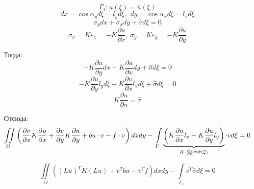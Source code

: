 \documentclass{bmstu}
\begin{document}
	\[\Gamma_1: u(\xi) = \hat u(\xi)\]
	\[dx = \cos \alpha_y d\xi = l_y d\xi,\ \ dy = \cos \alpha_x d\xi = l_x d\xi\]
	\[\sigma_y dx + \sigma_x dy + \hat \sigma d\xi = 0\]
	\[\sigma_x = K \varepsilon_x = -K \frac{\partial u}{\partial x},\ \sigma_y = K \varepsilon_y = -K \frac{\partial u}{\partial y}\]
	
	Тогда:
	\[-K \frac{\partial u}{\partial y} dx -K \frac{\partial u}{\partial x} dy + \hat \sigma d\xi = 0\]
	\[-K \frac{\partial u}{\partial y} l_y d\xi -K \frac{\partial u}{\partial x} l_x d\xi + \hat \sigma d\xi = 0\]
	\[K \frac{\partial u}{\partial n} = \hat \sigma\]
	
	Отсюда:
	\begin{equation}\label{2d_eq_2}
	\iint \limits_{\Omega} \left(\frac{\partial v}{\partial x} K \frac{\partial u}{\partial x} + \frac{\partial v}{\partial y} K \frac{\partial u}{\partial y} + bu \cdot v - f \cdot v\right) dx dy - \\
	\int \limits_{\Gamma} \underbrace{ \left(K \frac{\partial u}{\partial x} l_x + K \frac{\partial u}{\partial y} l_y\right)}_{K \cdot \frac{\partial u}{\partial n} = \hat \sigma(\xi)}  \cdot v d\xi = 0 
	\end{equation}
	
	\[\iint \limits_{\Omega} ((Lu)^T K (Lu) + v^T bu - v^T f) dxdy - \int \limits_{\Gamma_2} v^T \hat \sigma d\xi = 0\]
	
	
		
	
	
	
	
	
	
	
	
	
		
	
	
	
	
	
	
	
	
	
	
	
	
	
	
	
	
	   
\end{document}
